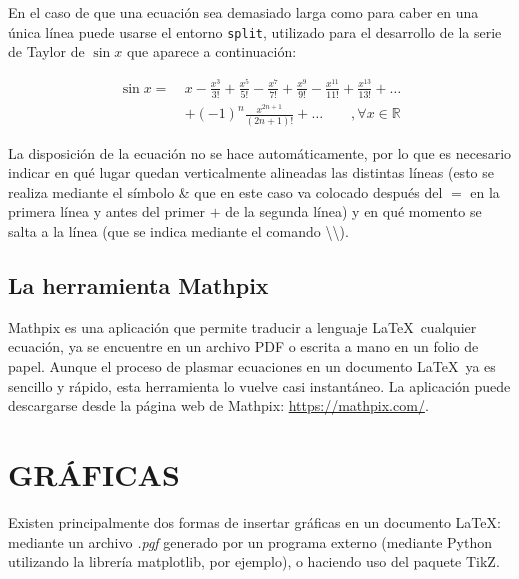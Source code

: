 \documentclass[a4paper, 11pt, spanish, twoside]{article}
\begin{document}
En el caso de que una ecuación sea demasiado larga como para caber en una única línea puede usarse el entorno \texttt{split}, utilizado para el desarrollo de la serie de Taylor de $\sin{x}$ que aparece a continuación:

\begin{equation}
\begin{split}
    \sin{x} = \ & x - \frac{x^3}{3!} + \frac{x^5}{5!} - \frac{x^7}{7!} + \frac{x^9}{9!} - \frac{x^{11}}{11!} + \frac{x^13}{13!} + \dots \\ & + (-1)^n \frac{x^{2n+1}}{(2n+1)!} + \dots \qquad , \forall x \in \mathbb{R}
    \label{eq:taylor}
\end{split}
\end{equation}

La disposición de la ecuación no se hace automáticamente, por lo que es necesario indicar en qué lugar quedan verticalmente alineadas las distintas líneas (esto se realiza mediante el símbolo \& que en este caso va colocado después del $=$ en la primera línea y antes del primer $+$ de la segunda línea) y en qué momento se salta a la línea (que se indica mediante el comando \textbackslash\textbackslash).


\subsection{La herramienta Mathpix}

Mathpix es una aplicación que permite traducir a lenguaje \LaTeX \ cualquier ecuación, ya se encuentre en un archivo PDF o escrita a mano en un folio de papel. Aunque el proceso de plasmar ecuaciones en un documento \LaTeX \ ya es sencillo y rápido, esta herramienta lo vuelve casi instantáneo. La aplicación puede descargarse desde la página web de Mathpix: \url{https://mathpix.com/}.




\newpage
\section{GRÁFICAS} \label{sec:graficas}

Existen principalmente dos formas de insertar gráficas en un documento \LaTeX: mediante un archivo \textit{.pgf} generado por un programa externo (mediante Python utilizando la librería matplotlib, por ejemplo), o haciendo uso del paquete TikZ.
\end{document}
